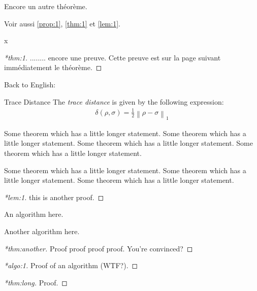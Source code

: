 \documentclass[12pt,a5paper]{article}
\begin{document}
\begin{theorem}
  \label{thm:another}
  Encore un autre th\'eor\`eme.
\end{theorem}


Voir aussi \autoref{prop:1}, \autoref{thm:1} et \autoref{lem:1}.

\cleardoublepage

x
\begin{proof}[*thm:1]
  ........ encore une preuve.  Cette preuve est sur la page suivant imm\'ediatement le
  th\'eor\`eme.
\end{proof}

Back to English:

\begin{thmheading}{Trace Distance}
  \label{thmheading:trace-dist}
  The \emph{trace distance} is given by the following expression:
  \begin{align}
    \delta(\rho,\sigma) = \frac12 \left\lVert \rho - \sigma \right\rVert_1
  \end{align}
\end{thmheading}

\begin{theorem}
  \label{thm:long}
  Some theorem which has a little longer statement.
  Some theorem which has a little longer statement.
  Some theorem which has a little longer statement.
  Some theorem which has a little longer statement.

  Some theorem which has a little longer statement.
  Some theorem which has a little longer statement.
  Some theorem which has a little longer statement.
\end{theorem}

\cleardoublepage

\begin{proof}[*lem:1]
  this is another proof.
\end{proof}

\begin{algorithm}
  \label{algo:1}
  An algorithm here.
\end{algorithm}

\begin{algorithm}
  \label{algo:2}
  Another algorithm here.
\end{algorithm}

\cleardoublepage

\begin{proof}[*thm:another]
  Proof proof proof proof. You're convinced?
\end{proof}

\begin{proof}[*algo:1]
  Proof of an algorithm (WTF?).
\end{proof}

\begin{proof}[*thm:long]
  Proof.
\end{proof}
\end{document}
